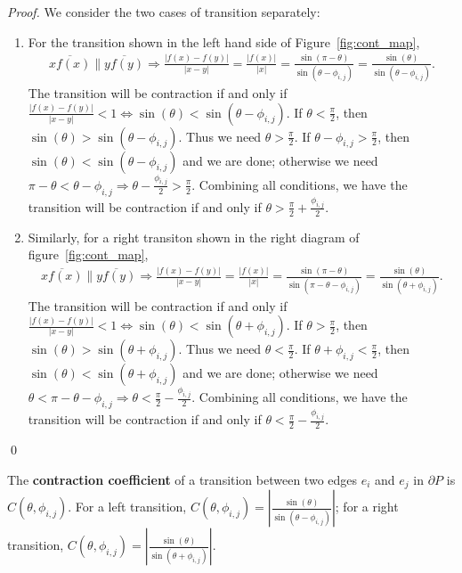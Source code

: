 \documentclass[]{styles/svproc}  %
\begin{document}
\begin{proof}
We consider the two cases of transition separately:
\begin{enumerate}
    \item For the transition shown in the left hand side of Figure~\ref{fig:cont_map}, 
          \begin{eqnarray*}\overline{xf(x)} \parallel \overline{yf(y)} \Rightarrow \frac{|f(x)-f(y)|}{|x-y|} = \frac{|f(x)|}{|x|} = \frac{\sin(\pi - \theta)}{\sin(\theta - \phi_{i, j})} = \frac{\sin(\theta)}{\sin(\theta-\phi_{i, j})}.\end{eqnarray*} The transition will be contraction if and only if $\frac{|f(x)-f(y)|}{|x-y|} < 1 \iff \sin(\theta)<\sin(\theta-\phi_{i, j})$. If $\theta < \frac{\pi}{2}$, then $\sin(\theta) > \sin(\theta-\phi_{i, j})$. Thus we need $\theta>\frac{\pi}{2}$. If $\theta-\phi_{i, j} > \frac{\pi}{2}$, then $\sin(\theta) < \sin(\theta-\phi_{i, j})$ and we are done; otherwise we need $\pi - \theta < \theta-\phi_{i, j} \Rightarrow \theta - \frac{\phi_{i, j}}{2} > \frac{\pi}{2}$. Combining all conditions, we have the transition will be contraction if and only if $\theta >\frac{\pi}{2} + \frac{\phi_{i, j}}{2}$.
    \item Similarly, for a right transiton shown in the right diagram of figure~\ref{fig:cont_map}, \begin{eqnarray*}\overline{xf(x)} \parallel \overline{yf(y)} \Rightarrow \frac{|f(x)-f(y)|}{|x-y|} = \frac{|f(x)|}{|x|} = \frac{\sin(\pi - \theta)}{\sin(\pi -\theta-\phi_{i, j})} = \frac{\sin(\theta)}{\sin(\theta + \phi_{i, j})}.\end{eqnarray*} The transition will be contraction if and only if $\frac{|f(x)-f(y)|}{|x-y|} < 1 \iff \sin(\theta)<\sin(\theta+\phi_{i, j})$. If $\theta  > \frac{\pi}{2}$, then $\sin(\theta) > \sin(\theta + \phi_{i, j})$. Thus we need $\theta<\frac{\pi}{2}$. If $\theta+\phi_{i, j} < \frac{\pi}{2}$, then $\sin(\theta) < \sin(\theta+\phi_{i, j})$ and we are done; otherwise we need $\theta < \pi-\theta-\phi_{i, j} \Rightarrow \theta < \frac{\pi}{2} - \frac{\phi_{i, j}}{2}$. Combining all conditions, we have the transition will be contraction if and only if $\theta <\frac{\pi}{2} - \frac{\phi_{i, j}}{2}$.
\end{enumerate}
\qed

\end{proof}


\begin{definition}
The \textbf{contraction coefficient} of a transition between two
edges $e_i$ and $e_j$ in $\partial P$ is $C(\theta, \phi_{i, j})$. 
For a left transition, $C(\theta, \phi_{i, j}) = | \frac{\sin(\theta)}{\sin(\theta - \phi_{i, j})} |$; 
for a right transition,  $C(\theta, \phi_{i, j}) = | \frac{\sin(\theta)}{\sin(\theta + \phi_{i, j})} |$.
\end{definition}
\end{document}
